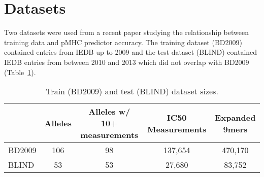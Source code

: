 \section*{Datasets}

Two datasets were used from a recent paper studying the relationship between training data and pMHC predictor accuracy\cite{Kim_2014}. The training dataset (BD2009) contained entries from IEDB\cite{Salimi_2012} up to 2009 and the test dataset (BLIND) contained IEDB entries from between 2010 and 2013 which did not overlap with BD2009 (Table~\ref{tab:datasets}).

\begin{table}[h!]
\label{tab:datasets}

\begin{tabular}{l||cccc}
\toprule
{} & Alleles & Alleles w/ 10+ measurements & IC50 Measurements & Expanded 9mers \\
\midrule
BD2009 &     106 &                          98 &           137,654 &        470,170 \\
BLIND  &      53 &                          53 &            27,680 &         83,752 \\
\bottomrule
\end{tabular}


\caption{Train (BD2009) and test (BLIND) dataset sizes.}
\end{table}
